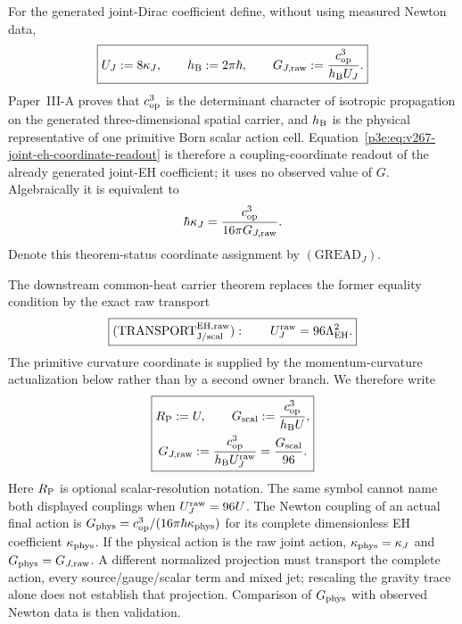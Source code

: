 \documentclass[12pt,a4paper]{article}
\begin{document}
\begin{definition}
\begin{enumerate}[label=(\roman*)]
For the generated joint-Dirac coefficient define, without using measured
Newton data,
\begin{equation}
\label{p3e:eq:v267-joint-eh-coordinate-readout}
 \boxed{U_{J}:=8\kappa_J,\qquad
        h_{\mathrm B}:=2\pi\hbar,\qquad
        G_{J,\rm raw}:=\frac{c_{\rm op}^{3}}{h_{\mathrm B}U_{J}}.}
\end{equation}
Paper~III-A proves that \(c_{\rm op}^{3}\) is the determinant character of
isotropic propagation on the generated three-dimensional spatial carrier, and
\(h_{\mathrm B}\) is the physical representative of one primitive Born scalar action
cell.  Equation~\eqref{p3e:eq:v267-joint-eh-coordinate-readout} is therefore a
coupling-coordinate readout of the already generated joint-EH coefficient; it
uses no observed value of \(G\).  Algebraically it is equivalent to
\[
 \hbar\kappa_J=\frac{c_{\rm op}^{3}}{16\pi G_{J,\rm raw}}.
\]
Denote this theorem-status coordinate assignment by
\((\mathrm{GREAD}_{J})\).

The downstream common-heat carrier theorem replaces the former equality
condition by the exact raw transport
\begin{equation}
\label{p3e:eq:v267-cross-owner-eh-match}
 \boxed{
 (\mathrm{TRANSPORT}_{\rm J/scal}^{\rm EH,raw}):\qquad
 U_J^{\rm raw}=96\Lambda_{\rm EH}^{2}.}
\end{equation}
The primitive curvature coordinate is supplied by the momentum-curvature
actualization below rather than by a second owner branch.  We therefore write
\begin{equation}
\label{p3e:eq:conditional-newton-matching}
 \boxed{\begin{gathered}
 R_{\mathrm P}:=U,\qquad G_{\rm scal}:=\frac{c_{\rm op}^{3}}{h_{\mathrm B} U},\\
 G_{J,\rm raw}:=\frac{c_{\rm op}^{3}}{h_{\mathrm B} U_J^{\rm raw}}
 =\frac{G_{\rm scal}}{96}.
 \end{gathered}}
\end{equation}
Here $R_{\mathrm P}$ is optional scalar-resolution notation. The same symbol cannot
name both displayed couplings when $U_J^{\rm raw}=96U$.
The Newton coupling of an actual final action is
$G_{\rm phys}=c_{\rm op}^3/(16\pi\hbar\kappa_{\rm phys})$ for its
complete dimensionless EH coefficient $\kappa_{\rm phys}$. If the physical
action is the raw joint action, $\kappa_{\rm phys}=\kappa_J$ and
$G_{\rm phys}=G_{J,\rm raw}$. A different normalized projection must
transport the complete action, every source/gauge/scalar term and mixed jet;
rescaling the gravity trace alone does not establish that projection.
Comparison of $G_{\rm phys}$ with observed Newton data is then validation.


\end{enumerate}
\end{definition}
\end{document}
